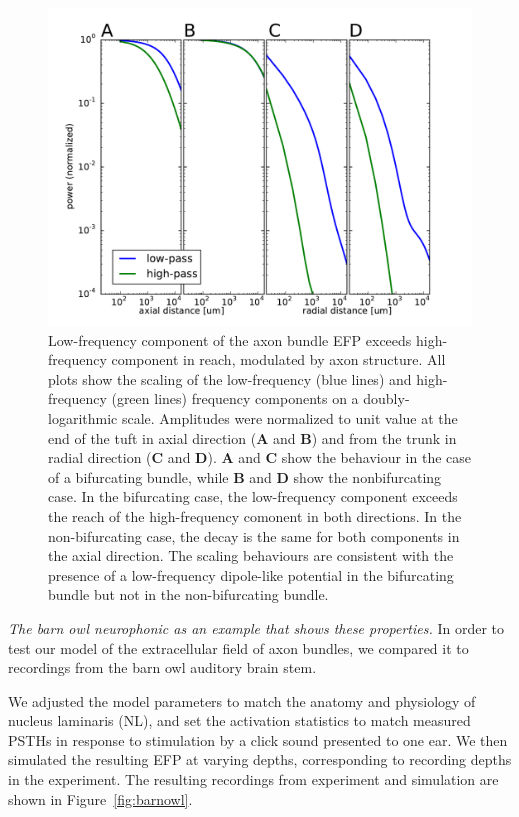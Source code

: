 \documentclass[]{article}
\begin{document}
\begin{figure}[htbp]
\centering
\includegraphics{../figs/fig_3.pdf}
\caption{\label{fig:distscaling}Low-frequency component of the axon
bundle EFP exceeds high-frequency component in reach, modulated by axon
structure. All plots show the scaling of the low-frequency (blue lines)
and high-frequency (green lines) frequency components on a
doubly-logarithmic scale. Amplitudes were normalized to unit value at
the end of the tuft in axial direction (\textbf{A} and \textbf{B}) and
from the trunk in radial direction (\textbf{C} and \textbf{D}).
\textbf{A} and \textbf{C} show the behaviour in the case of a
bifurcating bundle, while \textbf{B} and \textbf{D} show the
nonbifurcating case. In the bifurcating case, the low-frequency
component exceeds the reach of the high-frequency comonent in both
directions. In the non-bifurcating case, the decay is the same for both
components in the axial direction. The scaling behaviours are consistent
with the presence of a low-frequency dipole-like potential in the
bifurcating bundle but not in the non-bifurcating bundle.}
\end{figure}

\emph{The barn owl neurophonic as an example that shows these
properties.} In order to test our model of the extracellular field of
axon bundles, we compared it to recordings from the barn owl auditory
brain stem.

We adjusted the model parameters to match the anatomy and physiology of
nucleus laminaris (NL), and set the activation statistics to match
measured PSTHs in response to stimulation by a click sound presented to
one ear. We then simulated the resulting EFP at varying depths,
corresponding to recording depths in the experiment. The resulting
recordings from experiment and simulation are shown in
Figure~\ref{fig:barnowl}.
\end{document}

